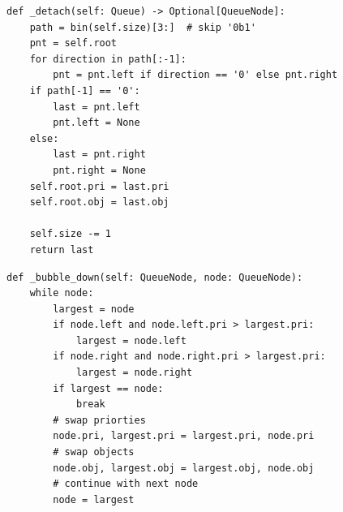 \documentclass[mathserif, handout]{beamer}
\begin{document}
\begin{frame}[fragile]
\begin{thmbox}
\begin{lstlisting}[style=mypython]
def _detach(self: Queue) -> Optional[QueueNode]:
    path = bin(self.size)[3:]  # skip '0b1'
    pnt = self.root
    for direction in path[:-1]:
        pnt = pnt.left if direction == '0' else pnt.right
    if path[-1] == '0':
        last = pnt.left
        pnt.left = None
    else:
        last = pnt.right
        pnt.right = None
    self.root.pri = last.pri
    self.root.obj = last.obj
    
    self.size -= 1
    return last

\end{lstlisting}
    
\end{thmbox}
\end{frame}


\begin{frame}[fragile]
\begin{thmbox}
\begin{lstlisting}[style=mypython]
def _bubble_down(self: QueueNode, node: QueueNode):
    while node:
        largest = node
        if node.left and node.left.pri > largest.pri:
            largest = node.left
        if node.right and node.right.pri > largest.pri:
            largest = node.right
        if largest == node:
            break
        # swap priorties
        node.pri, largest.pri = largest.pri, node.pri
        # swap objects
        node.obj, largest.obj = largest.obj, node.obj
        # continue with next node
        node = largest
\end{lstlisting}
\end{thmbox}
\end{frame}
\end{document}
